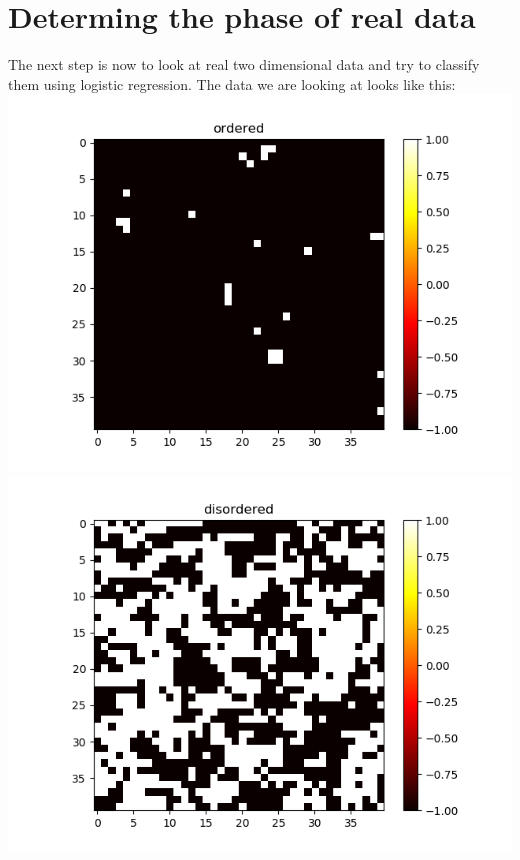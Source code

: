 \documentclass[a4paper,norsk]{article}
\begin{document}
\section{Determing the phase of real data}
The next step is now to look at real two dimensional data and try to classify them using logistic regression. The data we are looking at looks like this:\\
\includegraphics[scale=.7]{images/ordered}\\
\includegraphics[scale=.7]{images/disordered}\\
\end{document}
